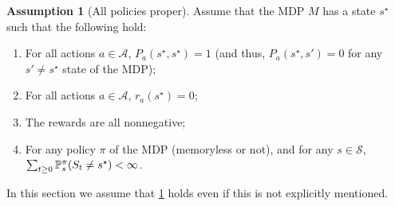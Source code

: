 \documentclass{article}
\DeclareMathOperator*{\1}{\mathbbm{1}}
\theoremstyle{definition}
\newtheorem{assumption}{Assumption}
\theoremstyle{remark}
\newcommand{\cS}{\mathcal{S}}
\newcommand{\cA}{\mathcal{A}}
\begin{document}
\newcommand{\term}{s^{\star}}
\begin{assumption}[All policies proper]\label{ass:app}
Assume that the MDP $M$ has a state $\term$ such that the following hold:
\begin{enumerate}
\item For all actions $a\in \cA$, $P_a(\term,\term)=1$ (and thus, $P_a(\term,s')=0$ for any $s'\ne \term$ state of the MDP);
\item For all actions $a\in \cA$, $r_a(\term)=0$;
\item The rewards are all nonnegative;
\item For any policy $\pi$ of the MDP (memoryless or not), 
and for any $s\in \cS$,
$\sum_{t\ge 0}\PP^{\pi}_s(S_t \ne \term)<\infty$.
\end{enumerate}
\end{assumption}
{\color{red} In this section we assume that \cref{ass:app} holds even if this is not explicitly mentioned.}
\end{document}
